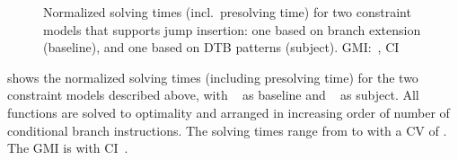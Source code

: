 

\begin{figure}
  \centering%
  \maxsizebox{\textwidth}{!}{%
    \trimBarchartPlot{%
    }%
  }

  \caption[%
            Plot comparing solving times for two constraint models supporting
            jump instruction insertion%
          ]%
          {%
            Normalized solving times (incl.\ presolving time) for two
            constraint models that supports jump insertion: one based on branch
            extension (baseline), and one based on DTB patterns (subject).
            GMI:~\printGMI{%
              \DualTargetPatternsVsBranchExtPrePlusSolvingTimeSpeedupPrePlusSolvingTimeRegularSpeedupGmean%
            },
            CI~\printGMICI{%
              \DualTargetPatternsVsBranchExtPrePlusSolvingTimeSpeedupPrePlusSolvingTimeRegularSpeedupCiMin%
            }{%
              \DualTargetPatternsVsBranchExtPrePlusSolvingTimeSpeedupPrePlusSolvingTimeRegularSpeedupCiMax%
            }%
          }
\end{figure}

shows the normalized solving times (including \gls{presolving} time) for the two
\glspl{constraint model} described above, with ~ as \gls{baseline} and ~ as \gls{subject}.
%
All \glspl{function} are solved to optimality and arranged in increasing order
of number of conditional branch \glspl{instruction}.
%
The solving times range from
\printMinSolvingTime{%
  \DualTargetPatternsVsBranchExtPrePlusSolvingTimeSpeedupSolvingTimeAvgMin,
  \DualTargetPatternsVsBranchExtPrePlusSolvingTimeSpeedupBaselineSolvingTimeAvgMin
}
to
\printMaxSolvingTime{%
  \DualTargetPatternsVsBranchExtPrePlusSolvingTimeSpeedupSolvingTimeAvgMax,
  \DualTargetPatternsVsBranchExtPrePlusSolvingTimeSpeedupBaselineSolvingTimeAvgMax
}
with a \gls{CV} of
\numMaxOf{%
  \DualTargetPatternsVsBranchExtPrePlusSolvingTimeSpeedupSolvingTimeCvMax,
  \DualTargetPatternsVsBranchExtPrePlusSolvingTimeSpeedupBaselineSolvingTimeCvMax
}.
The \gls{GMI} is \printGMI{%
  \DualTargetPatternsVsBranchExtPrePlusSolvingTimeSpeedupPrePlusSolvingTimeRegularSpeedupGmean%
} with \gls{CI}~\printGMICI{%
  \DualTargetPatternsVsBranchExtPrePlusSolvingTimeSpeedupPrePlusSolvingTimeRegularSpeedupCiMin%
}{%
  \DualTargetPatternsVsBranchExtPrePlusSolvingTimeSpeedupPrePlusSolvingTimeRegularSpeedupCiMax%
}.

